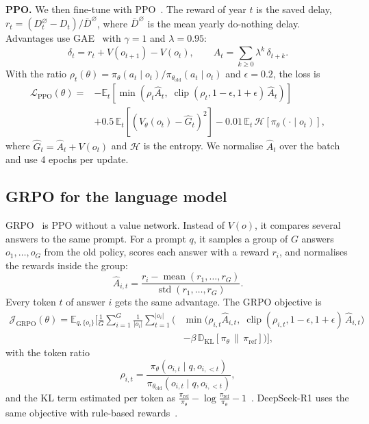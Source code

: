 \documentclass{article}
\begin{document}
\textbf{PPO.} We then fine-tune with PPO~\cite{schulman2017}. The reward of year $t$ is the saved delay, $r_t=(D^{\varnothing}_t-D_t)/\bar D^{\varnothing}$, where $\bar D^{\varnothing}$ is the mean yearly do-nothing delay. Advantages use GAE~\cite{schulman2016} with $\gamma=1$ and $\lambda=0.95$:
\begin{equation}
\delta_t=r_t+V(o_{t+1})-V(o_t),\qquad \hat A_t=\sum_{k\ge 0}\lambda^k\,\delta_{t+k}.
\end{equation}
With the ratio $\rho_t(\theta)=\pi_\theta(a_t\mid o_t)/\pi_{\theta_{\text{old}}}(a_t\mid o_t)$ and $\epsilon=0.2$, the loss is
\begin{equation}
\begin{aligned}
\mathcal{L}_{\text{PPO}}(\theta)={}&-\mathbb{E}_t\!\left[\min\!\left(\rho_t\hat A_t,\;\operatorname{clip}(\rho_t,1-\epsilon,1+\epsilon)\,\hat A_t\right)\right]\\
&+0.5\,\mathbb{E}_t\!\left[\left(V_\theta(o_t)-\hat G_t\right)^2\right]-0.01\,\mathbb{E}_t\,\mathcal{H}\!\left[\pi_\theta(\cdot\mid o_t)\right],
\end{aligned}
\end{equation}
where $\hat G_t=\hat A_t+V(o_t)$ and $\mathcal{H}$ is the entropy. We normalise $\hat A_t$ over the batch and use 4 epochs per update.

\subsection{GRPO for the language model}\label{app:grpo}

GRPO~\cite{shao2024} is PPO without a value network. Instead of $V(o)$, it compares several answers to the same prompt. For a prompt $q$, it samples a group of $G$ answers $o_1,\dots,o_G$ from the old policy, scores each answer with a reward $r_i$, and normalises the rewards inside the group:
\begin{equation}
\hat A_{i,t}=\frac{r_i-\operatorname{mean}(r_1,\dots,r_G)}{\operatorname{std}(r_1,\dots,r_G)}.
\end{equation}
Every token $t$ of answer $i$ gets the same advantage. The GRPO objective is
\begin{equation}\label{eq:grpo}
\begin{aligned}
\mathcal{J}_{\text{GRPO}}(\theta)=\mathbb{E}_{q,\{o_i\}}\Bigg[\frac{1}{G}\sum_{i=1}^{G}\frac{1}{|o_i|}\sum_{t=1}^{|o_i|}\Big(&\min\!\big(\rho_{i,t}\hat A_{i,t},\;\operatorname{clip}(\rho_{i,t},1-\epsilon,1+\epsilon)\,\hat A_{i,t}\big)\\
&-\beta\,\mathbb{D}_{\text{KL}}\!\left[\pi_\theta\,\|\,\pi_{\text{ref}}\right]\Big)\Bigg],
\end{aligned}
\end{equation}
with the token ratio
\begin{equation}
\rho_{i,t}=\frac{\pi_\theta(o_{i,t}\mid q,o_{i,<t})}{\pi_{\theta_{\text{old}}}(o_{i,t}\mid q,o_{i,<t})},
\end{equation}
and the KL term estimated per token as $\frac{\pi_{\text{ref}}}{\pi_\theta}-\log\frac{\pi_{\text{ref}}}{\pi_\theta}-1$~\cite{shao2024}. DeepSeek-R1 uses the same objective with rule-based rewards~\cite{guo2025}.
\end{document}
